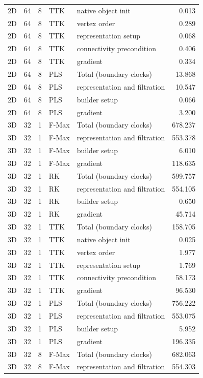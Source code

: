 \begin{tabular}{lrrllr}
2D & 64 & 8 & TTK & native object init & 0.013 \\
2D & 64 & 8 & TTK & vertex order & 0.289 \\
2D & 64 & 8 & TTK & representation setup & 0.068 \\
2D & 64 & 8 & TTK & connectivity precondition & 0.406 \\
2D & 64 & 8 & TTK & gradient & 0.334 \\
2D & 64 & 8 & PLS & Total (boundary clocks) & 13.868 \\
2D & 64 & 8 & PLS & representation and filtration & 10.547 \\
2D & 64 & 8 & PLS & builder setup & 0.066 \\
2D & 64 & 8 & PLS & gradient & 3.200 \\
3D & 32 & 1 & F-Max & Total (boundary clocks) & 678.237 \\
3D & 32 & 1 & F-Max & representation and filtration & 553.378 \\
3D & 32 & 1 & F-Max & builder setup & 6.010 \\
3D & 32 & 1 & F-Max & gradient & 118.635 \\
3D & 32 & 1 & RK & Total (boundary clocks) & 599.757 \\
3D & 32 & 1 & RK & representation and filtration & 554.105 \\
3D & 32 & 1 & RK & builder setup & 0.650 \\
3D & 32 & 1 & RK & gradient & 45.714 \\
3D & 32 & 1 & TTK & Total (boundary clocks) & 158.705 \\
3D & 32 & 1 & TTK & native object init & 0.025 \\
3D & 32 & 1 & TTK & vertex order & 1.977 \\
3D & 32 & 1 & TTK & representation setup & 1.769 \\
3D & 32 & 1 & TTK & connectivity precondition & 58.173 \\
3D & 32 & 1 & TTK & gradient & 96.530 \\
3D & 32 & 1 & PLS & Total (boundary clocks) & 756.222 \\
3D & 32 & 1 & PLS & representation and filtration & 553.075 \\
3D & 32 & 1 & PLS & builder setup & 5.952 \\
3D & 32 & 1 & PLS & gradient & 196.335 \\
3D & 32 & 8 & F-Max & Total (boundary clocks) & 682.063 \\
3D & 32 & 8 & F-Max & representation and filtration & 554.303 \\

\end{tabular}
